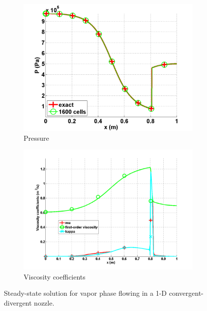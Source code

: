 \begin{figure}[H]
        \begin{subfigure}[b]{0.495\textwidth}
                \centering
                \includegraphics[width=\textwidth]{figures/vapor_pressure_numerical_and_exact_1600.png}
                \caption{Pressure}
                \label{fig:1d_nozzle_vap_press}
        \end{subfigure}

        \begin{subfigure}[b]{0.495\textwidth}
                \centering
                \includegraphics[width=\textwidth]{figures/vapor_viscosity_numerical1600.png}
                \caption{Viscosity coefficients}
                \label{fig:1d_nozzle_vap_visc}
        \end{subfigure}
        \caption{Steady-state solution for vapor phase flowing in a 1-D convergent-divergent nozzle.}
				\label{fig:1d_vap_nozzle}
\end{figure}
